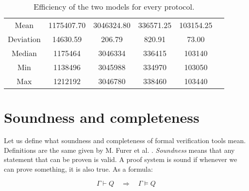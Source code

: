 \begin{table}[!ht]
{{\begin{tabular}{c|cc|cc|c}
                \multicolumn{1}{c|}{Mean}      & 1175407.70                                          & 3046324.80                              & 336571.25 & 103154.25 & \multicolumn{1}{l}{}                                                                                  \\ \cline{1-6}
                \multicolumn{1}{c|}{Deviation} & 14630.59                                            & 206.79                                  & 820.91    & 73.00     & \multicolumn{1}{l}{}                                                                                  \\ \cline{1-6}
                \multicolumn{1}{c|}{Median}    & 1175464                                             & 3046334                                 & 336415    & 103140    & \multicolumn{1}{l}{}                                                                                  \\ \cline{1-6}
                \multicolumn{1}{c|}{Min}       & 1138496                                             & 3045988                                 & 334970    & 103050    & \multicolumn{1}{l}{}                                                                                  \\ \cline{1-6}
                \multicolumn{1}{c|}{Max}       & 1212192                                             & 3046780                                 & 338460    & 103440    & \multicolumn{1}{l}{\parbox[t]{1em}{}}    \\
            \end{tabular}
        }
    }
    \caption{Efficiency of the two models for every protocol.}
    \label{tab:efficiency}
\end{table}


\section{Soundness and completeness}
Let us define what soundness and completeness of formal verification tools mean. Definitions are the same given by M. Furer et al. \cite{furer1989completeness}.
\textit{Soundness} means that any statement that can be proven is valid. A proof system is sound if whenever we can prove something, it is also true. As a formula:

\begin{equation}
    \Gamma \vdash Q \quad \Longrightarrow \quad \Gamma \models Q
\end{equation}

